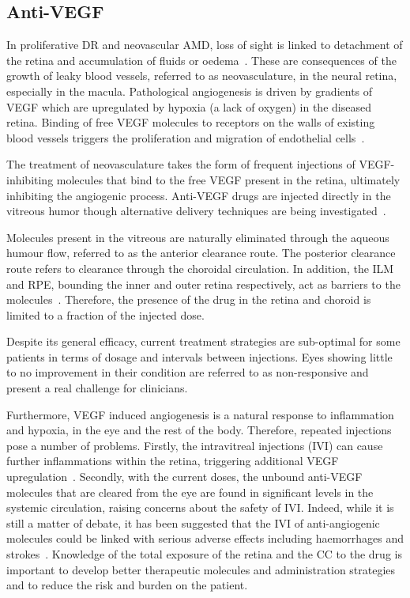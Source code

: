 \documentclass{article}
\begin{document}
\subsection{Anti-VEGF}\label{sec:Anti-VEGF}

In proliferative DR and neovascular AMD, loss of sight is linked to detachment of the retina and accumulation of fluids or oedema~\cite{Roberts_2020, Waldstein_2016}.
These are consequences of the growth of leaky blood vessels, referred to as neovasculature, in the neural retina, especially in the macula.
Pathological angiogenesis is driven by gradients of VEGF which are upregulated by hypoxia (a lack of oxygen) in the diseased retina.
Binding of free VEGF molecules to receptors on the walls of existing blood vessels triggers the proliferation and migration of endothelial cells~\cite{Ferrara_2004}.

The treatment of neovasculature takes the form of frequent injections of VEGF-inhibiting molecules that bind to the free VEGF present in the retina, ultimately inhibiting the angiogenic process.
Anti-VEGF drugs are injected directly in the vitreous humor though alternative delivery techniques are being investigated~\cite{Kim_2021}.

Molecules present in the vitreous are naturally eliminated through the aqueous humour flow, referred to as the anterior clearance route.
The posterior clearance route refers to clearance through the choroidal circulation.
In addition, the ILM and RPE, bounding the inner and outer retina respectively, act as barriers to the molecules~\cite{Park_2015}.
Therefore, the presence of the drug in the retina and choroid is limited to a fraction of the injected dose. 

Despite its general efficacy, current treatment strategies are sub-optimal for some patients in terms of dosage and intervals between injections.
Eyes showing little to no improvement in their condition are referred to as non-responsive and present a real challenge for clinicians.

Furthermore, VEGF induced angiogenesis is a natural response to inflammation and hypoxia, in the eye and the rest of the body. 
Therefore, repeated injections pose a number of problems.
Firstly, the intravitreal injections (IVI) can cause further inflammations within the retina, triggering additional VEGF upregulation~\cite{Iyer_2022}.
Secondly, with the current doses, the unbound anti-VEGF molecules that are cleared from the eye are found in significant levels in the systemic circulation, raising concerns about the safety of IVI.
Indeed, while it is still a matter of debate, it has been suggested that the IVI of anti-angiogenic molecules could be linked with serious adverse effects including haemorrhages and strokes~\cite{Avery_2016, Kaiser_2019, Maloney_2021}.
Knowledge of the total exposure of the retina and the CC to the drug is important to develop better therapeutic molecules and administration strategies and to reduce the risk and burden on the patient.
\end{document}
